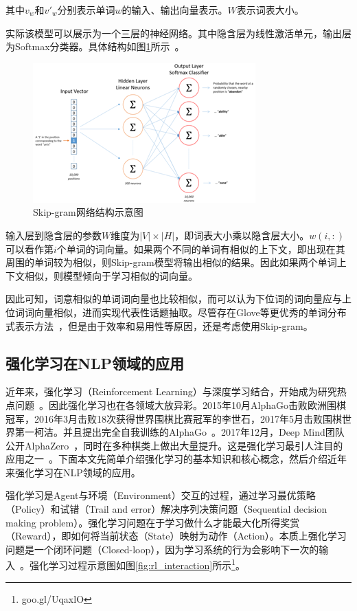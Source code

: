 其中$v_w$和$v'_w$分别表示单词$w$的输入、输出向量表示。$W$表示词表大小。

实际该模型可以展示为一个三层的神经网络。其中隐含层为线性激活单元，输出层为Softmax分类器。具体结构如图\ref{fig:skip_gram_structure}所示~。
\begin{figure}
	\centering
	\includegraphics[width=.65\linewidth]{./figures/skip_gram_structure.jpg}
	\caption{Skip-gram网络结构示意图}
	\label{fig:skip_gram_structure}
\end{figure}

输入层到隐含层的参数$W$维度为$|V|\times |H|$，即词表大小乘以隐含层大小。$w(i,:)$可以看作第$i$个单词的词向量。如果两个不同的单词有相似的上下文，即出现在其周围的单词较为相似，则Skip-gram模型将输出相似的结果。因此如果两个单词上下文相似，则模型倾向于学习相似的词向量。

因此可知，词意相似的单词词向量也比较相似，而可以认为下位词的词向量应与上位词词向量相似，进而实现代表性话题抽取。尽管存在Glove等更优秀的单词分布式表示方法~，但是由于效率和易用性等原因，还是考虑使用Skip-gram。

\subsection{强化学习在NLP领域的应用}

近年来，强化学习（Reinforcement Learning）与深度学习结合，开始成为研究热点问题~。因此强化学习也在各领域大放异彩。2015年10月AlphaGo击败欧洲围棋冠军，2016年3月击败18次获得世界围棋比赛冠军的李世石，2017年5月击败围棋世界第一柯洁。并且提出完全自我训练的AlphaGo~。2017年12月，Deep Mind团队公开AlphaZero~，同时在多种棋类上做出大量提升。这是强化学习最引人注目的应用之一~。下面本文先简单介绍强化学习的基本知识和核心概念，然后介绍近年来强化学习在NLP领域的应用。

强化学习是Agent与环境（Environment）交互的过程，通过学习最优策略（Policy）和试错（Trail and error）解决序列决策问题（Sequential decision making problem）。强化学习问题在于学习做什么才能最大化所得奖赏（Reward），即如何将当前状态（State）映射为动作（Action）。本质上强化学习问题是一个闭环问题（Closed-loop），因为学习系统的行为会影响下一次的输入~。强化学习过程示意图如图\ref{fig:rl_interaction}所示\footnote{goo.gl/UqaxlO}。

